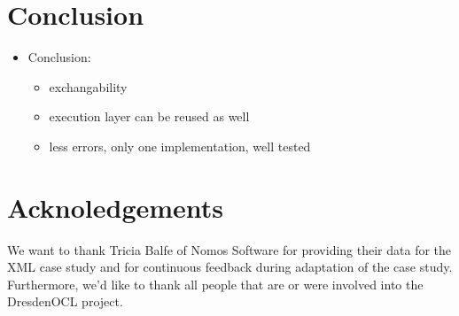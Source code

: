 \section{Conclusion}
\label{sec:conclusion}
\begin{itemize}
  \item Conclusion:
  \begin{itemize}
    \item exchangability
    \item execution layer can be reused as well
    \item less errors, only one implementation, well tested
  \end{itemize}  
\end{itemize}

\section{Acknoledgements}

We want to thank Tricia Balfe of Nomos Software for providing their data for the XML case study and for continuous feedback during adaptation of the case study.
Furthermore, we'd like to thank all people that are or were involved into the DresdenOCL project.